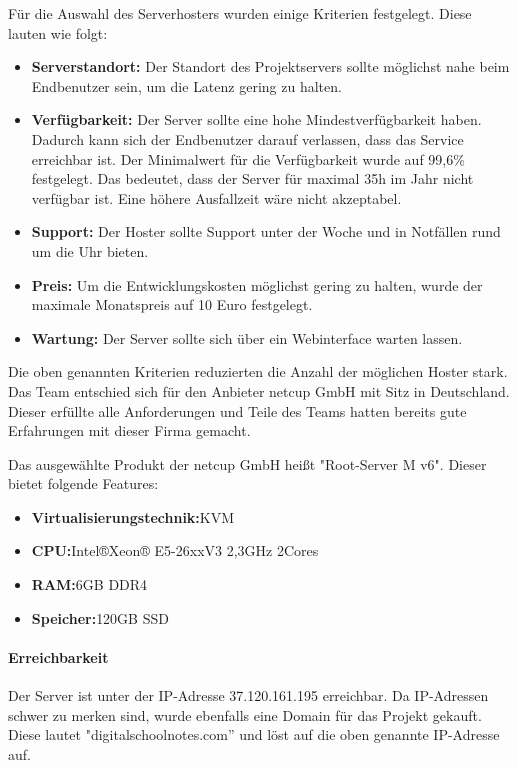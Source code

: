 Für die Auswahl des Serverhosters wurden einige Kriterien festgelegt. Diese lauten wie folgt:
\begin{itemize}
\item \textbf{Serverstandort:} Der Standort des Projektservers sollte möglichst nahe beim Endbenutzer sein, um die \gls{Latenz} gering zu halten.
\item \textbf{Verfügbarkeit:} Der Server sollte eine hohe Mindestverfügbarkeit haben. Dadurch kann sich der Endbenutzer darauf verlassen, dass das Service erreichbar ist. Der Minimalwert für die Verfügbarkeit wurde auf 99,6\% festgelegt. Das bedeutet, dass der Server für maximal 35h im Jahr nicht verfügbar ist. Eine höhere Ausfallzeit wäre nicht akzeptabel.
\item \textbf{Support:} Der Hoster sollte Support unter der Woche und in Notfällen rund um die Uhr bieten.
\item \textbf{Preis:} Um die Entwicklungskosten möglichst gering zu halten, wurde der maximale Monatspreis auf 10 Euro festgelegt.
\item \textbf{Wartung:} Der Server sollte sich über ein Webinterface warten lassen.
\end{itemize}

Die oben genannten Kriterien reduzierten die Anzahl der möglichen Hoster stark. Das Team entschied sich für den Anbieter netcup GmbH mit Sitz in Deutschland. Dieser erfüllte alle Anforderungen und Teile des Teams hatten bereits gute Erfahrungen mit dieser Firma gemacht.

Das ausgewählte Produkt der netcup GmbH heißt "Root-Server M v6". Dieser bietet folgende Features:
\begin{itemize}
\item \textbf{Virtualisierungstechnik:}\gls{KVM}
\item \textbf{CPU:}Intel®Xeon® E5-26xxV3 2,3GHz 2Cores
\item \textbf{RAM:}6GB DDR4
\item \textbf{Speicher:}120GB SSD
\end{itemize}

\paragraph{Erreichbarkeit}
Der Server ist unter der IP-Adresse 37.120.161.195 erreichbar. Da IP-Adressen schwer zu merken sind, wurde ebenfalls eine Domain für das Projekt gekauft. Diese lautet "digitalschoolnotes.com'' und löst auf die oben genannte IP-Adresse auf.

